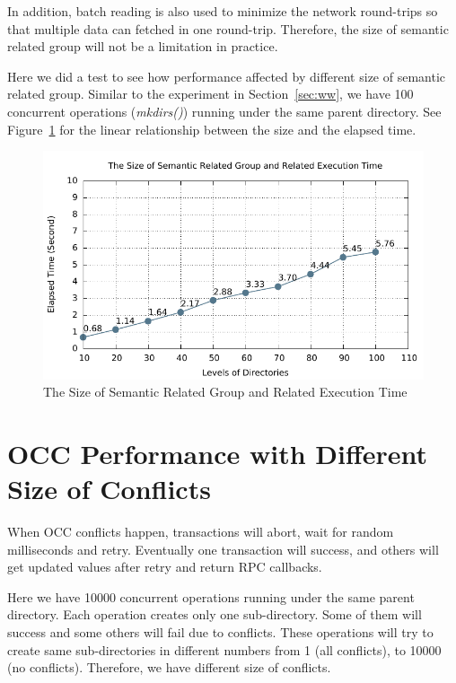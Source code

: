 \noindent In addition, batch reading is also used to minimize the network round-trips so that multiple data can fetched in one round-trip. Therefore, the size of semantic related group will not be a limitation in practice. 

\noindent Here we did a test to see how performance affected by different size of semantic related group. Similar to the experiment in Section~\ref{sec:ww}, we have 100 concurrent operations (\textit{mkdirs()}) running under the same parent directory. See Figure~\ref{fig:srg} for the linear relationship between the size and the elapsed time.

\begin{figure}[ht]
	\centering
	\includegraphics[width=\linewidth]{figs/srgSize.pdf}
	\caption{The Size of Semantic Related Group and Related Execution Time}
	\label{fig:srg}
\end{figure}

\section{OCC Performance with Different Size of Conflicts}

When OCC conflicts happen, transactions will abort, wait for random milliseconds and retry. Eventually one transaction will success, and others will get updated values after retry and return RPC callbacks.

\noindent Here we have 10000 concurrent operations running under the same parent directory. Each operation creates only one sub-directory. Some of them will success and some others will fail due to conflicts. These operations will try to create same sub-directories in different numbers from 1 (all conflicts), to 10000 (no conflicts). Therefore, we have different size of conflicts.


